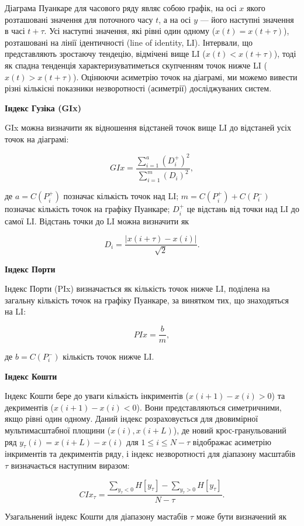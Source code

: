 \documentclass[
  letterpaper,
]{report}
\begin{document}
Діаграма Пуанкаре для часового ряду являє собою графік, на осі \(x\)
якого розташовані значення для поточного часу \(t\), а на осі \(y\) ---
його наступні значення в часі \(t+\tau\). Усі наступні значення, які
рівні один одному (\(x(t) = x(t+\tau)\)), розташовані на лінії
ідентичності (line of identity, LI). Інтервали, що представляють
зростаючу тендецію, відмічені вище LI (\(x(t)<x(t+\tau)\)), тоді як
спадна тенденція характеризуватиметься скупченням точок нижче LI
(\(x(t)>x(t+\tau)\)). Оцінюючи асиметрію точок на діаграмі, ми можемо
вивести різні кількісні показники незворотності (асиметрії)
досліджуваних систем.

\textbf{Індекс Гузіка (GIx)}

GIx можна визначити як відношення відстаней точок вище LI до відстаней
усіх точок на діаграмі:

\[ 
GIx = \frac{\sum_{i=1}^{a} \left( D_{i}^{+} \right)^{2}}{\sum_{i=1}^{m} \left( D_{i} \right)^{2} }, 
\]

де \(a = C(P_{i}^{+})\) позначає кількість точок над LI;
\(m = C(P_{i}^{+}) + C(P_{i}^{-})\) позначає кількість точок на графіку
Пуанкаре; \(D_{i}^{+}\) це відстань від точки над LI до самої LI.
Відстань точки до LI можна визначити як

\[ 
D_{i} = \frac{|x(i+\tau) - x(i)|}{\sqrt{2}}. 
\]

\textbf{Індекс Порти}

Індекс Порти (PIx) визначається як кількість точок нижче LI, поділена на
загальну кількість точок на графіку Пуанкаре, за винятком тих, що
знаходяться на LI:

\[ 
PIx = \frac{b}{m}, 
\]

де \(b = C(P_{i}^{-})\) кількість точок нижче LI.

\textbf{Індекс Кошти}

Індекс Кошти бере до уваги кількість інкриментів (\(x(i+1)-x(i) > 0\))
та декриментів (\(x(i+1)-x(i) < 0\)). Вони представляються симетричними,
якщо рівні один одному. Даний індекс розраховується для двовимірної
мультимасштабної площини (\(x(i), x(i+L)\)), де новий крос-гранульований
ряд \(y_{\tau}(i) = x(i+L)-x(i)\) для \(1 \leq i \leq N-\tau\)
відображає асиметрію інкриментів та декриментів ряду, і індекс
незворотності для діапазону масштабів \(\tau\) визначається наступним
виразом:

\[ 
CIx_{\tau} = \frac{\sum_{y_{\tau}<0} H[y_{\tau}] - \sum_{y_{\tau}>0} H[y_{\tau}]}{N-\tau}. 
\]

Узагальнений індекс Кошти для діапазону мастабів \(\tau\) може бути
визначений як
\end{document}

